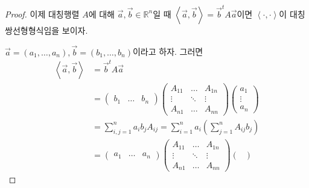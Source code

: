\documentclass[sections/engineering_mathematics_lecture_note.tex]{subfiles}
\begin{document}
\begin{proof}
    이제 대칭행렬 $A$에 대해 $\vec a, \vec b \in \mathbb R^n$일 때 $\left<\vec a, \vec b\right> = \vec b^t A \vec a$이면 $\left<\cdot, \cdot\right>$이 대칭 쌍선형형식임을 보이자.

    $\vec a = (a_1, \dots, a_n), \vec b = (b_1, \dots, b_n)$이라고 하자.
    그러면
    \begin{align*}
        \left<\vec a, \vec b\right> &= \vec b^t A \vec a\\
                                    &=
                                    \begin{pmatrix}
                                        b_1 & \dots & b_n
                                    \end{pmatrix}
                                    \begin{pmatrix}
                                        A_{11} & \dots & A_{1n}\\
                                        \vdots & \ddots & \vdots\\
                                        A_{n1} & \dots & A_{nn}
                                    \end{pmatrix}
                                    \begin{pmatrix}
                                        a_1\\
                                        \vdots\\
                                        a_n
                                    \end{pmatrix}\\
                                    &= \sum_{i, j = 1}^n a_i b_j A_{ij} = \sum_{i = 1}^n a_i \left(\sum_{j = 1}^n A_{ij} b_j\right)\\
                                    &=
                                    \begin{pmatrix}
                                        a_1 & \dots & a_n
                                    \end{pmatrix}
                                    \begin{pmatrix}
                                        A_{11} & \dots & A_{1n}\\
                                        \vdots & \ddots & \vdots\\
                                        A_{n1} & \dots & A_{nn}
                                    \end{pmatrix}
                                    \begin{pmatrix}

\end{pmatrix}
\end{align*}
\end{proof}
\end{document}
